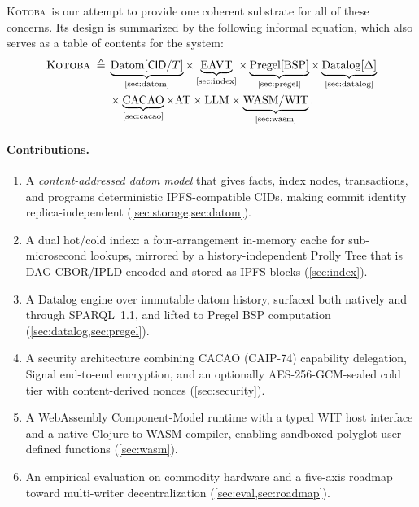 \documentclass[11pt]{article}
\newcommand{\kotoba}{\textsc{Kotoba}}
\newcommand{\cid}{\textsf{CID}}
\newcommand{\eq}{\;\triangleq\;}
\begin{document}
\kotoba\ is our attempt to provide one coherent substrate for all of these
concerns. Its design is summarized by the following informal equation, which
also serves as a table of contents for the system:
%
\begin{equation}
\label{eq:kotoba}
\begin{aligned}
\kotoba \eq&
\underbrace{\mathrm{Datom}[\cid/T]}_{\text{\cref{sec:datom}}}
\times
\underbrace{\mathrm{EAVT}}_{\text{\cref{sec:index}}}
\times
\underbrace{\mathrm{Pregel}[\mathrm{BSP}]}_{\text{\cref{sec:pregel}}}
\times
\underbrace{\mathrm{Datalog}[\Delta]}_{\text{\cref{sec:datalog}}}
\\
&\times
\underbrace{\mathrm{CACAO}}_{\text{\cref{sec:cacao}}}
\times
\mathrm{AT}
\times
\mathrm{LLM}
\times
\underbrace{\mathrm{WASM/WIT}}_{\text{\cref{sec:wasm}}}.
\end{aligned}
\end{equation}

\paragraph{Contributions.}
\begin{enumerate}[leftmargin=1.4em,itemsep=2pt]
  \item A \emph{content-addressed datom model} that gives facts, index nodes,
    transactions, and programs deterministic IPFS-compatible \cid{}s, making
    commit identity replica-independent
    (\cref{sec:storage,sec:datom}).
  \item A dual hot/cold index: a four-arrangement in-memory cache for
    sub-microsecond lookups, mirrored by a history-independent Prolly Tree that
    is DAG-CBOR/IPLD-encoded and stored as IPFS blocks (\cref{sec:index}).
  \item A Datalog engine over immutable datom history, surfaced both natively
    and through SPARQL~1.1, and lifted to Pregel BSP computation
    (\cref{sec:datalog,sec:pregel}).
  \item A security architecture combining CACAO (CAIP-74) capability delegation,
    Signal end-to-end encryption, and an optionally AES-256-GCM-sealed cold tier
    with content-derived nonces (\cref{sec:security}).
  \item A WebAssembly Component-Model runtime with a typed WIT host interface and
    a native Clojure-to-WASM compiler, enabling sandboxed polyglot user-defined
    functions (\cref{sec:wasm}).
  \item An empirical evaluation on commodity hardware and a five-axis roadmap
    toward multi-writer decentralization (\cref{sec:eval,sec:roadmap}).
\end{enumerate}
\end{document}
